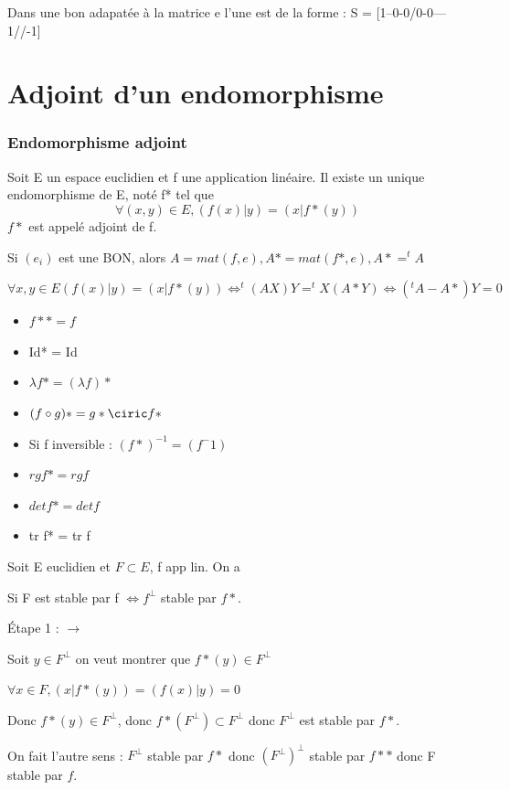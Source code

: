 \documentclass[french]{yLectureNote}
\begin{document}
Dans une bon adapatée à la matrice e l'une est de la forme : S = [1--0-0/0-0---1//-1]
\section{Adjoint d'un endomorphisme}
\subsubsection{Endomorphisme adjoint}
\begin{definition}
    Soit E un espace euclidien et f une application linéaire. Il existe un unique endomorphisme de E, noté f* tel que 
    $$\forall (x,y)\in E, (f(x)|y) = (x|f*(y))$$
    $f*$ est appelé adjoint de f.

    Si $(e_i)$ est une BON, alors $A = mat(f,e), A*=mat(f*,e), A* = ^tA$
\end{definition}
\begin{myproof}
    $\forall x,y \in E (f(x)|y)=(x|f*(y)) \iff ^t(AX)Y=^tX(A*Y) \iff (^tA-A*)Y=0$
\end{myproof}
\begin{proposition}
    \begin{itemize}
        \item $f** = f$
        \item Id* = Id
        \item $\lambda f* = (\lambda f)*$
        \item $(f\circ g)* = g*\ciric f*$
        \item Si f inversible : $(f*)^{-1} = (f^-1)$
    \end{itemize}
\end{proposition}
\begin{proposition}
    \begin{itemize}
        \item $rg f* = rg f$
        \item $det f* = det f$
        \item tr f* = tr f
    \end{itemize}
\end{proposition}
\begin{proposition}
    Soit E euclidien et $F\subset E$, f app lin. On a 
    
    Si F est stable par f $\iff f^{\perp}$ stable par $f*$.
\end{proposition}
\begin{myproof}
    Étape 1 : $\rightarrow$

    Soit $y\in F^{\perp}$ on veut montrer que $f*(y)\in F^{\perp}$

    $\forall x\in  F, (x|f*(y)) = (f(x)|y) = 0$

    Donc $f*(y)\in F^{\perp}$, donc $f*(F^{\perp})\subset F^{\perp}$ donc $F^{\perp}$ est stable par $f*$.

    On fait l'autre sens :
    $F^{\perp}$ stable par $f*$ donc $(F^\perp)^\perp$ stable par $f**$ donc F stable par $f$.

\end{myproof}
\end{document}
